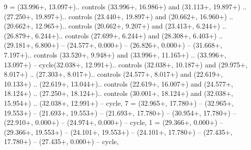 {9} = {(33.996+\ctpXshift, 13.097+\ctpYshift).. controls (33.996+\ctpXshift, 16.986+\ctpYshift) and (31.113+\ctpXshift, 19.897+\ctpYshift) .. (27.250+\ctpXshift, 19.897+\ctpYshift).. controls (23.440+\ctpXshift, 19.897+\ctpYshift) and (20.662+\ctpXshift, 16.960+\ctpYshift) .. (20.662+\ctpXshift, 12.965+\ctpYshift).. controls (20.662+\ctpXshift, 9.207+\ctpYshift) and (23.413+\ctpXshift, 6.244+\ctpYshift) .. (26.879+\ctpXshift, 6.244+\ctpYshift).. controls (27.699+\ctpXshift, 6.244+\ctpYshift) and (28.308+\ctpXshift, 6.403+\ctpYshift) .. (29.181+\ctpXshift, 6.800+\ctpYshift) -- (24.577+\ctpXshift, 0.000+\ctpYshift) -- (26.826+\ctpXshift, 0.000+\ctpYshift) -- (31.668+\ctpXshift, 7.197+\ctpYshift).. controls (33.520+\ctpXshift, 9.948+\ctpYshift) and (33.996+\ctpXshift, 11.165+\ctpYshift) .. (33.996+\ctpXshift, 13.097+\ctpYshift) -- cycle(32.038+\ctpXshift, 12.991+\ctpYshift).. controls (32.038+\ctpXshift, 10.187+\ctpYshift) and (29.975+\ctpXshift, 8.017+\ctpYshift) .. (27.303+\ctpXshift, 8.017+\ctpYshift).. controls (24.577+\ctpXshift, 8.017+\ctpYshift) and (22.619+\ctpXshift, 10.133+\ctpYshift) .. (22.619+\ctpXshift, 13.044+\ctpYshift).. controls (22.619+\ctpXshift, 16.007+\ctpYshift) and (24.577+\ctpXshift, 18.124+\ctpYshift) .. (27.250+\ctpXshift, 18.124+\ctpYshift).. controls (30.001+\ctpXshift, 18.124+\ctpYshift) and (32.038+\ctpXshift, 15.954+\ctpYshift) .. (32.038+\ctpXshift, 12.991+\ctpYshift) -- cycle},
{7} = {(32.965+\ctpXshift, 17.780+\ctpYshift) -- (32.965+\ctpXshift, 19.553+\ctpYshift) -- (21.693+\ctpXshift, 19.553+\ctpYshift) -- (21.693+\ctpXshift, 17.780+\ctpYshift) -- (30.954+\ctpXshift, 17.780+\ctpYshift) -- (22.910+\ctpXshift, 0.000+\ctpYshift) -- (24.974+\ctpXshift, 0.000+\ctpYshift) -- cycle},
{1} = {(29.366+\ctpXshift, 0.000+\ctpYshift) -- (29.366+\ctpXshift, 19.553+\ctpYshift) -- (24.101+\ctpXshift, 19.553+\ctpYshift) -- (24.101+\ctpXshift, 17.780+\ctpYshift) -- (27.435+\ctpXshift, 17.780+\ctpYshift) -- (27.435+\ctpXshift, 0.000+\ctpYshift) -- cycle},
